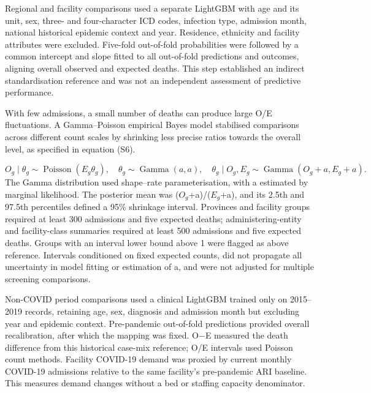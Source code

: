 \documentclass[11pt,a4paper]{article}
\newcommand{\subheading}[1]{\par\needspace{3\baselineskip}\vspace{5pt}{\bfseries #1}\par\vspace{1pt}}
\begin{document}
\subheading{S1.6 Case-mix standardisation}
Regional and facility comparisons used a separate LightGBM with age and its unit, sex, three- and four-character ICD codes, infection type, admission month, national historical epidemic context and year. Residence, ethnicity and facility attributes were excluded. Five-fold out-of-fold probabilities were followed by a common intercept and slope fitted to all out-of-fold predictions and outcomes, aligning overall observed and expected deaths. This step established an indirect standardisation reference and was not an independent assessment of predictive performance.

With few admissions, a small number of deaths can produce large O/E fluctuations. A Gamma–Poisson empirical Bayes model stabilised comparisons across different count scales by shrinking less precise ratios towards the overall level, as specified in equation (S6).

\begin{equation}
O_g\mid\theta_g\sim\operatorname{Poisson}(E_g\theta_g),\quad\theta_g\sim\operatorname{Gamma}(a,a),\quad\theta_g\mid O_g,E_g\sim\operatorname{Gamma}(O_g+a,E_g+a).
\end{equation}
The Gamma distribution used shape–rate parameterisation, with a estimated by marginal likelihood. The posterior mean was ($O_g$+a)/($E_g$+a), and its 2.5th and 97.5th percentiles defined a 95\% shrinkage interval. Provinces and facility groups required at least 300 admissions and five expected deaths; administering-entity and facility-class summaries required at least 500 admissions and five expected deaths. Groups with an interval lower bound above 1 were flagged as above reference. Intervals conditioned on fixed expected counts, did not propagate all uncertainty in model fitting or estimation of a, and were not adjusted for multiple screening comparisons.

\subheading{S1.7 Non-COVID outcomes and demographic disparities}
Non-COVID period comparisons used a clinical LightGBM trained only on 2015–2019 records, retaining age, sex, diagnosis and admission month but excluding year and epidemic context. Pre-pandemic out-of-fold predictions provided overall recalibration, after which the mapping was fixed. O$-$E measured the death difference from this historical case-mix reference; O/E intervals used Poisson count methods. Facility COVID-19 demand was proxied by current monthly COVID-19 admissions relative to the same facility’s pre-pandemic ARI baseline. This measures demand changes without a bed or staffing capacity denominator.
\end{document}
